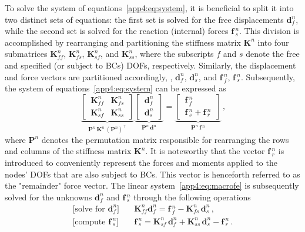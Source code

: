To solve the system of equations~\eqref{app4:eq:system}, it is beneficial to split it into two distinct sets of equations: the first set is solved for the free displacements $\mathbf{d}^{n}_{f}$, while the second set is solved for the reaction (internal) forces $\mathbf{f}{\,}^{n}_{s}$. This division is accomplished by rearranging and partitioning the stiffness matrix $\mathbf{K}^{n}$ into four submatrices $\mathbf{K}^{n}_{ff}$, $\mathbf{K}^{n}_{fs}$, $\mathbf{K}^{n}_{sf}$, and $\mathbf{K}^{n}_{ss}$, where the subscripts $f$ and $s$ denote the free and specified (or subject to \acp{BC}) \acp{DOF}, respectively. Similarly, the displacement and force vectors are partitioned accordingly, \eg{}, $\mathbf{d}^{n}_{f}$, $\mathbf{d}^{n}_{s}$, and $\mathbf{f}{\,}^{n}_{f}$, $\mathbf{f}{\,}^{n}_{s}$. Subsequently, the system of equations~\eqref{app4:eq:system} can be expressed as
%
\begin{equation}
    \label{app4:eq:macrofe}
    \underbrace{\left[\,\begin{matrix}
      \mathbf{K}^{n}_{ff} & \mathbf{K}^{n}_{fs} \\[0.5em]
      \mathbf{K}^{n}_{sf} & \mathbf{K}^{n}_{ss}
    \end{matrix}\,\right]}_{\displaystyle \mathbf{P}^{n} \, \mathbf{K}^{n} \, (\mathbf{P}^{n})^\top} \underbrace{\left[\,\begin{matrix}
      \mathbf{d}^{n}_{f} \\[0.5em]
      \mathbf{d}^{n}_{s}
    \end{matrix}\,\right]}_{\displaystyle \mathbf{P}^{n} \, \mathbf{d}^{n}} = \underbrace{\left[\,\begin{matrix}
      \mathbf{f}{\,}^{n}_{f} \\[0.5em]
      \mathbf{f}{\,}^{n}_{s} + \mathbf{f}{\,}^{n}_{r}
    \end{matrix}\,\right]}_{\displaystyle \mathbf{P}^{n} \, \mathbf{f}{\,}^{n}} \, \text{,}
\end{equation}
%
where $\mathbf{P}^{n}$ denotes the permutation matrix responsible for rearranging the rows and columns of the stiffness matrix $\mathbf{K}^{n}$. It is noteworthy that the vector $\mathbf{f}{\,}^{n}_{r}$ is introduced to conveniently represent the forces and moments applied to the nodes' \acp{DOF} that are also subject to \acp{BC}. This vector is henceforth referred to as the "remainder" force vector. The linear system~\eqref{app4:eq:macrofe} is subsequently solved for the unknowns $\mathbf{d}^{n}_{f}$ and $\mathbf{f}{\,}^{n}_{s}$ through the following operations
%
\begin{subequations}
  \label{app4:eq:macrosol}
  \begin{align}
    \textrm{[solve for $\mathbf{d}^{n}_{f}$]} \quad & \mathbf{K}^{n}_{ff}\mathbf{d}^{n}_{f} = \mathbf{f}{\,}^{n}_{f} - \mathbf{K}^{n}_{fs}\,\mathbf{d}^{n}_{s} \label{app4:eq:macrodf} \, \text{,} \\
    \textrm{[compute $\mathbf{f}{\,}^{n}_{s}$]} \quad & \mathbf{f}{\,}^{n}_{s} = \mathbf{K}^{n}_{sf}\,\mathbf{d}^{n}_{f} + \mathbf{K}^{n}_{ss}\,\mathbf{d}^{n}_{s} - \mathbf{f}{\,}^{n}_{r} \, \text{.} \label{app4:eq:macrosolfs}
  \end{align}
\end{subequations}
